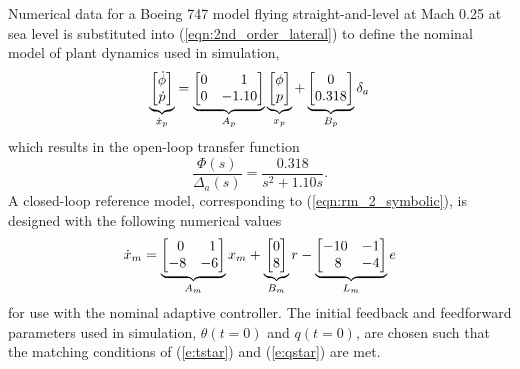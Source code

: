 Numerical data for a Boeing 747 model flying straight-and-level at Mach 0.25 at sea level \cite{heffley1972aircraft} is substituted into (\ref{eqn:2nd_order_lateral}) to define the nominal model of plant dynamics used in simulation,
\begin{equation}
		\underbrace{\begin{bmatrix}
			\dot{\phi} \\ \dot{p}
		\end{bmatrix}}_{\dot{x}_p} = \underbrace{\begin{bmatrix}
			0 & \hfil 1 \\ 0 & -1.10
		\end{bmatrix}}_{A_p} \underbrace{\begin{bmatrix}
			\phi \\ p
		\end{bmatrix}}_{x_p} + \underbrace{\begin{bmatrix}
			0 \\ 0.318
		\end{bmatrix}}_{B_p} \delta_a \label{eqn:siso_plant_nominal_num}
\end{equation} \noindent which results in the open-loop transfer function 
\begin{equation}
		\frac{\Phi(s)}{\Delta_a(s)} = \frac{0.318}{s^2 + 1.10s}. 
\end{equation}
A closed-loop reference model, corresponding to (\ref{eqn:rm_2_symbolic}), is designed with the following numerical values
\begin{equation}
	\dot{x}_m = \underbrace{\begin{bmatrix}
		\hfil~0 & \hfil~1\\ -8 & -6
	\end{bmatrix}}_{A_m} x_m + \underbrace{\begin{bmatrix}
		0 \\ 8
	\end{bmatrix}}_{B_m} r - \underbrace{\begin{bmatrix}
		\hfil -10 & \hfil -1 \\ \hfil 8 & \hfil -4
	\end{bmatrix}}_{L_m} e
	\label{eqn:rm_2}
\end{equation}
\noindent for use with the nominal adaptive controller. The initial feedback and feedforward parameters used in simulation, $\theta(t=0)$ and $q(t=0)$, are chosen such that the matching conditions of (\ref{e:tstar}) and (\ref{e:qstar}) are met.

